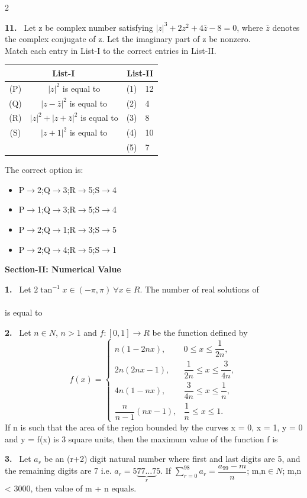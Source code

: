 \documentclass[10pt]{extarticle}
\newcommand{\sect}[1]{\par\smallskip\noindent\textbf{#1}\par}
\newcommand{\qn}[1]{\par\smallskip\noindent\textbf{#1.}~}
\newenvironment{qoptions}{\begin{itemize}[leftmargin=1.8em,itemsep=1pt,topsep=2pt,label={}]}{\end{itemize}}
\newcommand{\opt}[2]{\item[(#1)] #2}
\begin{document}
\begin{multicols}{2}
\qn{11} Let z be complex number satisfying $|z|^3+2z^2+4\bar z-8=0$, where $\bar z$ denotes the complex conjugate of z. Let the imaginary part of z be nonzero.\\
Match each entry in List-I to the correct entries in List-II.
\begin{center}
\begin{tabular}{|c|c|c|l|}
\hline
\multicolumn{2}{|c|}{List-I} & \multicolumn{2}{c|}{List-II} \\
\hline
(P) & $|z|^2$ is equal to & (1) & 12 \\
\hline
(Q) & $|z-\bar z|^2$ is equal to & (2) & 4 \\
\hline
(R) & $|z|^2+|z+\bar z|^2$ is equal to & (3) & 8 \\
\hline
(S) & $|z+1|^2$ is equal to & (4) & 10 \\
\hline
 & & (5) & 7 \\
\hline
\end{tabular}
\end{center}
The correct option is:
\begin{qoptions}
\opt{A}{P$\to$2;Q$\to$3;R$\to$5;S$\to$4}
\opt{B}{P$\to$1;Q$\to$3;R$\to$5;S$\to$4}
\opt{C}{P$\to$2;Q$\to$1;R$\to$3;S$\to$5}
\opt{D}{P$\to$2;Q$\to$4;R$\to$5;S$\to$1}
\end{qoptions}

\sect{Section-II: Numerical Value}

\qn{1} Let $2\tan^{-1}x\in(-\pi,\pi)\ \forall x\in R$. The number of real solutions of\\
\\
is equal to

\qn{2} Let $n\in N$, $n>1$ and $f:[0,1]\to R$ be the function defined by
$$f(x)=\begin{cases}n(1-2nx), & 0\le x\le\dfrac{1}{2n},\\[4pt] 2n(2nx-1), & \dfrac{1}{2n}\le x\le\dfrac{3}{4n},\\[4pt] 4n(1-nx), & \dfrac{3}{4n}\le x\le\dfrac1n,\\[4pt] \dfrac{n}{n-1}(nx-1), & \dfrac1n\le x\le1.\end{cases}$$
If n is such that the area of the region bounded by the curves x = 0, x = 1, y = 0 and y = f(x) is 3 square units, then the maximum value of the function f is

\qn{3} Let $a_r$ be an (r+2) digit natural number where first and last digits are 5, and the remaining digits are 7 i.e. $a_r=5\underbrace{77\ldots7}_{r}5$. If $\displaystyle\sum_{r=0}^{98}a_r=\dfrac{a_{99}-m}{n}$; m,n$\in N$; m,n < 3000, then value of m + n equals.


\end{multicols}
\end{document}
